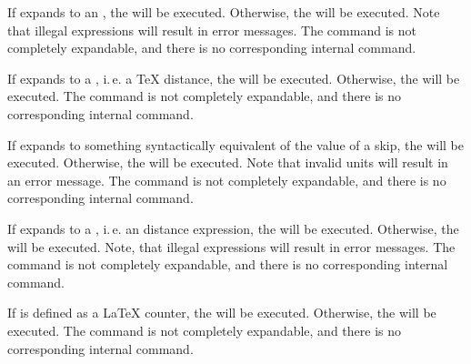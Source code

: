 \begin{Declaration}
\end{Declaration}
If  expands to an \eTeX{}
, the  will be executed.
Otherwise, the  will be executed. Note
that illegal expressions will result in error messages. The command is not
completely expandable, and there is no corresponding internal command.%
\EndIndexGroup


\begin{Declaration}
\end{Declaration}
If  expands to a
, i.\,e. a \TeX{} distance, the  will be
executed. Otherwise, the  will be executed. The command is not
completely expandable, and there is no corresponding internal command.%
\EndIndexGroup


\begin{Declaration}
\end{Declaration}
If  expands to something
syntactically equivalent of the value of a skip, the  will be
executed. Otherwise, the  will be executed.
Note that invalid units will result in an error message.
The command is not completely expandable, and there is no corresponding
internal command.%
\EndIndexGroup


\begin{Declaration}
\end{Declaration}
If  expands to a
, i.\,e. an \eTeX{} distance expression, the  will be executed. Otherwise, the  will be executed.
Note, that illegal expressions will result in error
messages. The command is not completely expandable, and there is no
corresponding internal command.%
\EndIndexGroup


\begin{Declaration}
\end{Declaration}
If  is defined as a
\LaTeX{} counter, the  will be executed. Otherwise, the
 will be executed. The command is not completely expandable,
and there is no corresponding internal command.%
\EndIndexGroup


